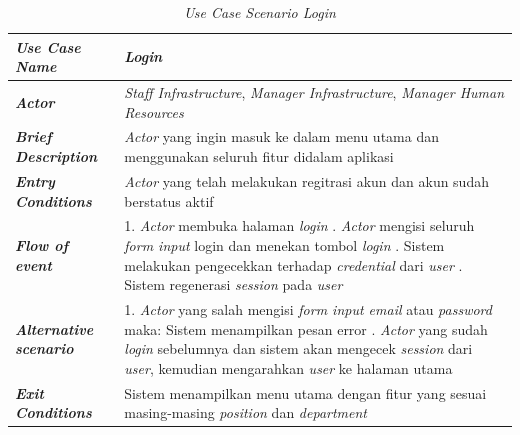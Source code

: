 \FloatBarrier
\begin{longtable}{ |p{6cm}|p{8cm}|}
\caption{\textit{Use Case Scenario Login}}\label{tab:use-case-scenario-login} 
\\
\hline
\textbf{\textit{Use Case Name}}
&\textit{Login}
\\ \hline

\textbf{\textit{Actor}}
&\textit{Staff Infrastructure}, \textit{Manager Infrastructure}, \textit{Manager Human Resources} 
\\ \hline

\textbf{\textit{Brief Description}}
&\textit{Actor} yang ingin masuk ke dalam menu utama dan menggunakan seluruh fitur didalam aplikasi
\\ \hline

\textbf{\textit{Entry Conditions}}
&\textit{Actor} yang telah melakukan regitrasi akun dan akun sudah berstatus aktif
\\ \hline

\textbf{\textit{Flow of event}}
&1. \textit{Actor} membuka halaman \textit{login}
\newline
2. \textit{Actor} mengisi seluruh \textit{form input} login dan menekan tombol \textit{login}
\newline
3. Sistem melakukan pengecekkan terhadap \textit{credential} dari \textit{user}
\newline
4. Sistem regenerasi \textit{session} pada \textit{user}
\\ \hline

\textbf{\textit{Alternative scenario}}
&1. \textit{Actor} yang salah mengisi \textit{form input email} atau \textit{password} maka: Sistem menampilkan pesan error
\newline
2. \textit{Actor} yang sudah \textit{login} sebelumnya dan sistem akan mengecek \textit{session} dari \textit{user}, kemudian mengarahkan \textit{user} ke halaman utama
\\ \hline

\textbf{\textit{Exit Conditions}}
&Sistem menampilkan menu utama dengan fitur yang sesuai masing-masing \textit{position} dan \textit{department}
\\ \hline
\end{longtable}

